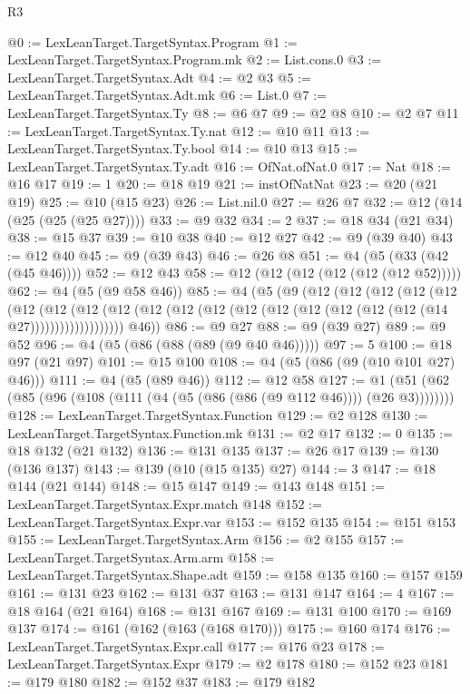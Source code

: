 \begin{lexlean}{R3}
\begin{coremodule}
@0 := LexLeanTarget.TargetSyntax.Program
@1 := LexLeanTarget.TargetSyntax.Program.mk
@2 := List.cons.{0}
@3 := LexLeanTarget.TargetSyntax.Adt
@4 := @2 @3
@5 := LexLeanTarget.TargetSyntax.Adt.mk
@6 := List.{0}
@7 := LexLeanTarget.TargetSyntax.Ty
@8 := @6 @7
@9 := @2 @8
@10 := @2 @7
@11 := LexLeanTarget.TargetSyntax.Ty.nat
@12 := @10 @11
@13 := LexLeanTarget.TargetSyntax.Ty.bool
@14 := @10 @13
@15 := LexLeanTarget.TargetSyntax.Ty.adt
@16 := OfNat.ofNat.{0}
@17 := Nat
@18 := @16 @17
@19 := 1
@20 := @18 @19
@21 := instOfNatNat
@23 := @20 (@21 @19)
@25 := @10 (@15 @23)
@26 := List.nil.{0}
@27 := @26 @7
@32 := @12 (@14 (@25 (@25 (@25 @27))))
@33 := @9 @32
@34 := 2
@37 := @18 @34 (@21 @34)
@38 := @15 @37
@39 := @10 @38
@40 := @12 @27
@42 := @9 (@39 @40)
@43 := @12 @40
@45 := @9 (@39 @43)
@46 := @26 @8
@51 := @4 (@5 (@33 (@42 (@45 @46))))
@52 := @12 @43
@58 := @12 (@12 (@12 (@12 (@12 (@12 @52)))))
@62 := @4 (@5 (@9 @58 @46))
@85 := @4
    (@5
      (@9
        (@12
          (@12
            (@12
              (@12
                (@12
                  (@12
                    (@12
                      (@12
                        (@12
                          (@12 (@12 (@12 (@12 (@12 (@12 (@12 (@12 (@12 (@14 @27)))))))))))))))))))
        @46))
@86 := @9 @27
@88 := @9 (@39 @27)
@89 := @9 @52
@96 := @4 (@5 (@86 (@88 (@89 (@9 @40 @46)))))
@97 := 5
@100 := @18 @97 (@21 @97)
@101 := @15 @100
@108 := @4 (@5 (@86 (@9 (@10 @101 @27) @46)))
@111 := @4 (@5 (@89 @46))
@112 := @12 @58
@127 := @1 (@51 (@62 (@85 (@96 (@108 (@111 (@4 (@5 (@86 (@86 (@9 @112 @46)))) (@26 @3))))))))
@128 := LexLeanTarget.TargetSyntax.Function
@129 := @2 @128
@130 := LexLeanTarget.TargetSyntax.Function.mk
@131 := @2 @17
@132 := 0
@135 := @18 @132 (@21 @132)
@136 := @131 @135
@137 := @26 @17
@139 := @130 (@136 @137)
@143 := @139 (@10 (@15 @135) @27)
@144 := 3
@147 := @18 @144 (@21 @144)
@148 := @15 @147
@149 := @143 @148
@151 := LexLeanTarget.TargetSyntax.Expr.match @148
@152 := LexLeanTarget.TargetSyntax.Expr.var
@153 := @152 @135
@154 := @151 @153
@155 := LexLeanTarget.TargetSyntax.Arm
@156 := @2 @155
@157 := LexLeanTarget.TargetSyntax.Arm.arm
@158 := LexLeanTarget.TargetSyntax.Shape.adt
@159 := @158 @135
@160 := @157 @159
@161 := @131 @23
@162 := @131 @37
@163 := @131 @147
@164 := 4
@167 := @18 @164 (@21 @164)
@168 := @131 @167
@169 := @131 @100
@170 := @169 @137
@174 := @161 (@162 (@163 (@168 @170)))
@175 := @160 @174
@176 := LexLeanTarget.TargetSyntax.Expr.call
@177 := @176 @23
@178 := LexLeanTarget.TargetSyntax.Expr
@179 := @2 @178
@180 := @152 @23
@181 := @179 @180
@182 := @152 @37
@183 := @179 @182

\end{coremodule}
\end{lexlean}
